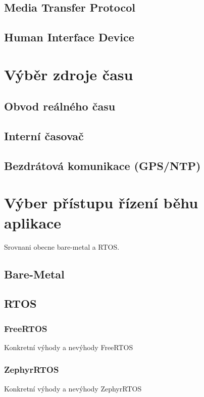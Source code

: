 \subsection{Media Transfer Protocol}

\subsection{Human Interface Device}

\section{Výběr zdroje času}

\subsection{Obvod reálného času}

\subsection{Interní časovač}

\subsection{Bezdrátová komunikace (GPS/NTP)}

\section{Výber přístupu řízení běhu aplikace}
Srovnani obecne bare-metal a RTOS.


\subsection{Bare-Metal}

\subsection{RTOS}
\subsubsection{FreeRTOS}
Konkretní výhody a nevýhody FreeRTOS

\subsubsection{ZephyrRTOS}
Konkretní výhody a nevýhody ZephyrRTOS

